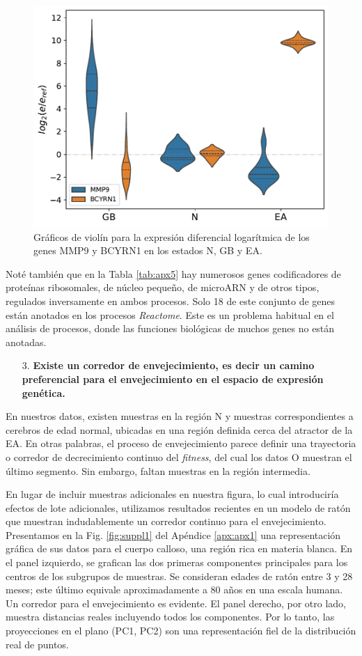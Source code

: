 \begin{figure}[!htb]
	\centering
	\includegraphics[width=0.75\linewidth]{figures/Fig_1d.pdf}
	\caption{Gráficos de violín para la expresión diferencial logarítmica de los genes MMP9 y BCYRN1 en los estados N, GB y EA.}
	\label{fig:fig1d}
\end{figure}

Noté también que en la Tabla \ref{tab:apx5} hay numerosos genes codificadores de proteínas ribosomales, de núcleo pequeño, de microARN y de otros tipos, regulados inversamente en ambos procesos. Solo 18 de este conjunto de genes están anotados en los procesos \textit{Reactome}. Este es un problema habitual en el análisis de procesos, donde las funciones biológicas de muchos genes no están anotadas.

\begin{enumerate}
	\item[3.] \textbf{Existe un corredor de envejecimiento, es decir un camino preferencial para el envejecimiento en el espacio de expresión genética.}
\end{enumerate}

En nuestros datos, existen muestras en la región N y muestras correspondientes a cerebros de edad normal, ubicadas en una región definida cerca del atractor de la EA. En otras palabras, el proceso de envejecimiento parece definir una trayectoria o corredor de decrecimiento continuo del \textit{fitness}, del cual los datos O muestran el último segmento. Sin embargo, faltan muestras en la región intermedia.

En lugar de incluir muestras adicionales en nuestra figura, lo cual introduciría efectos de lote adicionales, utilizamos resultados recientes en un modelo de ratón \cite{hahn2023atlas} que muestran indudablemente un corredor continuo para el envejecimiento. Presentamos en la Fig. \ref{fig:suppl1} del Apéndice \ref{apx:apx1} una representación gráfica de sus datos para el cuerpo calloso, una región rica en materia blanca. En el panel izquierdo, se grafican las dos primeras componentes principales para los centros de los subgrupos de muestras. Se consideran edades de ratón entre 3 y 28 meses; este último equivale aproximadamente a 80 años en una escala humana. Un corredor para el envejecimiento es evidente. El panel derecho, por otro lado, muestra distancias reales incluyendo todos los componentes. Por lo tanto, las proyecciones en el plano (PC1, PC2) son una representación fiel de la distribución real de puntos.

